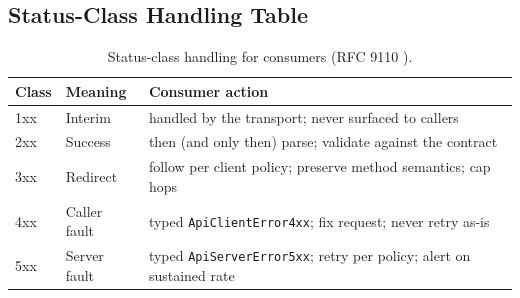 \subsection{Status-Class Handling Table}

\begin{table}[h]
  \centering
  \small
  \begin{tabularx}{\textwidth}{l l X}
    \toprule
    \textbf{Class} & \textbf{Meaning} & \textbf{Consumer action} \\
    \midrule
    1xx & Interim & handled by the transport; never surfaced to callers \\
    2xx & Success & then (and only then) parse; validate against the contract \\
    3xx & Redirect & follow per client policy; preserve method semantics; cap hops \\
    4xx & Caller fault & typed \texttt{ApiClientError4xx}; fix request; never retry as-is \\
    5xx & Server fault & typed \texttt{ApiServerError5xx}; retry per policy; alert on sustained rate \\
    \bottomrule
  \end{tabularx}
  \caption{Status-class handling for consumers (RFC 9110 \cite{rfc9110}).}
  \label{tab:ch02-status-classes}
\end{table}



